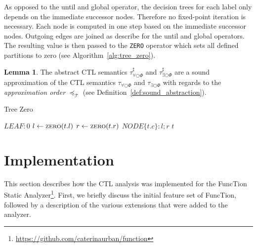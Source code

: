 \documentclass[11pt,a4paper,titlepage]{article}
\theoremstyle{definition}
\newtheorem{lemma}[theorem]{Lemma}
\begin{document}
As opposed to the \textsf{until} and \textsf{global} operator, the decision trees for each label only depends on the immediate successor nodes.
Therefore no fixed-point iteration is necessary. Each node is computed in one step based on the immediate successor nodes.
Outgoing edges are joined as describe for the \textsf{until} and \textsf{global} operators. 
The resulting value is then passed to the \texttt{ZERO}
operator which sets all defined partitions to zero (see Algorithm~\ref{alg:tree_zero}).


\begin{lemma}
    The abstract CTL semantics 
    $\tau^{\sharp}_{\forall\bigcirc\Phi}$ and $\tau^{\sharp}_{\exists\bigcirc\Phi}$
    are a sound approximation of the CTL semantics
    $\tau_{\forall\bigcirc\Phi}$ and $\tau_{\exists\bigcirc\Phi}$
    with regards to the \textit{approximation order} $\preceq_\mathcal{T}$ (see Definition~\ref{def:sound_abstraction}).
\end{lemma}


\begin{algorithm}                      
    \caption{Tree Zero}         
    \label{alg:tree_zero}       
    \begin{algorithmic}
                \State \Return $LEAF: 0$
                \State $l \gets \Call{zero}{t.l}$
                \State $r \gets \Call{zero}{t.r}$
                \State \Return $NODE\{t.c \}: l ; r$
            \Else
                \State \Return $t$
            \EndIf 
        \EndFunction
\end{algorithmic}
\end{algorithm}

\section{Implementation}

This section describes how the CTL analysis was implemented for the 
FuncTion Static Analyzer\footnote{\url{https://github.com/caterinaurban/function}}. 
First, we briefly discuss the initial feature set of FuncTion, 
followed by a description of the various extensions that were added to the analyzer.
\end{document}
